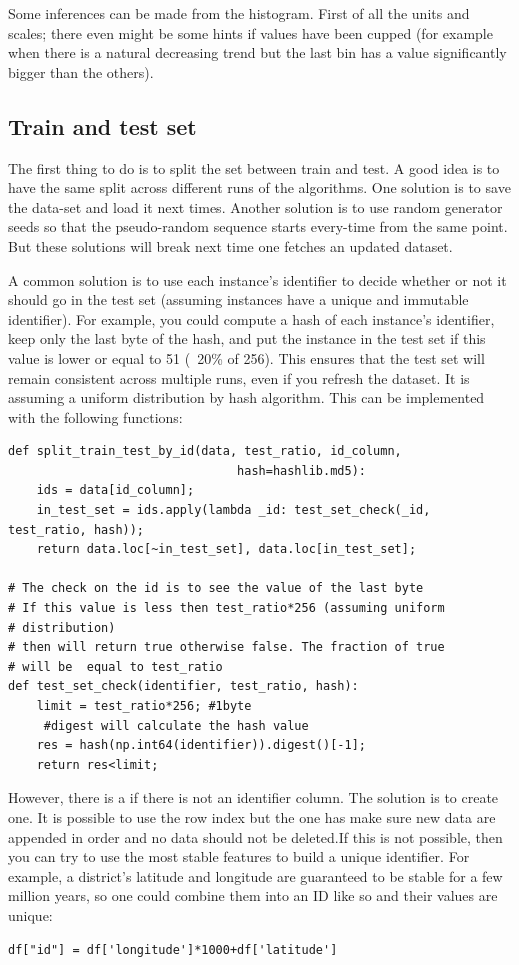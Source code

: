 Some inferences can be made from the histogram. First of all the units and scales; there even might be some hints if values have been cupped (for example when there is a natural decreasing trend but the last bin has a value significantly bigger than the others).

\subsection{Train and test set}
The first thing to do is to split the set between train and test. A good idea is to have the same split across different runs of the algorithms. One solution is to save the data-set and load it next times. Another solution is to use random generator seeds so that the pseudo-random sequence starts every-time from the same point. But these solutions will break next time one fetches an updated dataset. 

A common solution is to use each instance's identifier to decide whether or not it should go in the test set (assuming instances have a unique and immutable identifier). For example, you could compute a hash of each instance's identifier, keep only the last byte of the hash, and put the instance in the test set if this value is lower or equal to 51 (~20\% of 256). This ensures that the test set will remain consistent across multiple runs, even if you refresh the dataset. It is assuming a uniform distribution by hash algorithm. This can be implemented with the following functions:

\begin{lstlisting}[caption=Example of function to split according to the last by of the hash on the id.]
def split_train_test_by_id(data, test_ratio, id_column, 
		                        hash=hashlib.md5):
    ids = data[id_column];
    in_test_set = ids.apply(lambda _id: test_set_check(_id,  test_ratio, hash));
    return data.loc[~in_test_set], data.loc[in_test_set];

# The check on the id is to see the value of the last byte
# If this value is less then test_ratio*256 (assuming uniform 
# distribution) 
# then will return true otherwise false. The fraction of true
# will be  equal to test_ratio
def test_set_check(identifier, test_ratio, hash):
    limit = test_ratio*256; #1byte
     #digest will calculate the hash value 
    res = hash(np.int64(identifier)).digest()[-1];
    return res<limit;
\end{lstlisting}

However, there is a  if there is not an identifier column. The solution is to create one. It is possible to use the row index but the one has make sure new data are appended in order and no data should not be deleted.If this is not possible, then you can try to use the most stable features to build a unique identifier. For example, a district's latitude and longitude are guaranteed to be stable for a few million years, so one could combine them into an ID like so and their values are unique:
\begin{lstlisting}[caption="Creating a column ID from stable features such as latitude and longitude.]
df["id"] = df['longitude']*1000+df['latitude']
\end{lstlisting}

